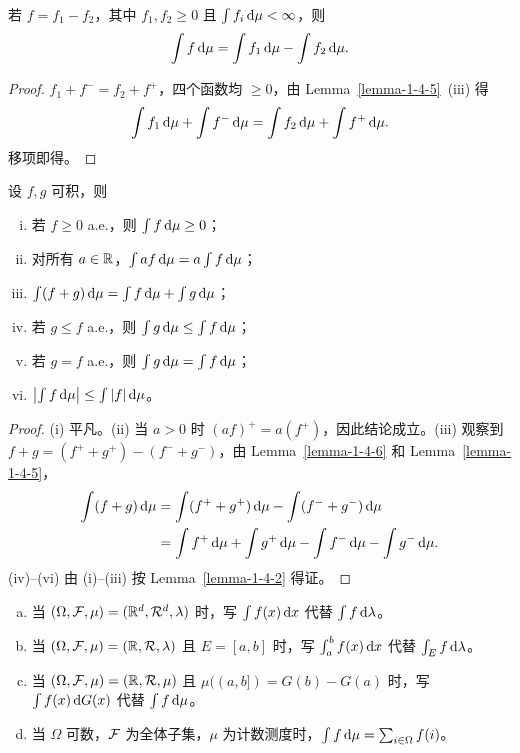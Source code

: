 \begin{lemma}\label{lemma-1-4-6}
    若 $f = f_1 - f_2$，其中 $f_1, f_2 \ge 0$ 且 $\int f_i \,\mathrm{d}\mu < \infty$，则
    \[
        \int f \,\mathrm{d}\mu = \int f_1 \,\mathrm{d}\mu - \int f_2 \,\mathrm{d}\mu.
    \]
\end{lemma}

\begin{proof}
    $f_1 + f^- = f_2 + f^+$，四个函数均 $\ge 0$，由 Lemma~\ref{lemma-1-4-5}~(iii) 得
    \[
        \int f_1 \,\mathrm{d}\mu + \int f^- \,\mathrm{d}\mu = \int f_2 \,\mathrm{d}\mu + \int f^+ \,\mathrm{d}\mu.
    \]
    移项即得。
\end{proof}

\begin{theorem}\label{theorem-1-4-7}
    设 $f,g$ 可积，则
    \begin{enumerate}[(i)]
        \item 若 $f \ge 0$ a.e.，则 $\int f \,\mathrm{d}\mu \ge 0$；
        \item 对所有 $a \in \mathbb{R}$，$\int af \,\mathrm{d}\mu = a \int f \,\mathrm{d}\mu$；
        \item $\int (f+g) \,\mathrm{d}\mu = \int f \,\mathrm{d}\mu + \int g \,\mathrm{d}\mu$；
        \item 若 $g \le f$ a.e.，则 $\int g \,\mathrm{d}\mu \le \int f \,\mathrm{d}\mu$；
        \item 若 $g = f$ a.e.，则 $\int g \,\mathrm{d}\mu = \int f \,\mathrm{d}\mu$；
        \item $\left|\int f \,\mathrm{d}\mu\right| \le \int |f| \,\mathrm{d}\mu$。
    \end{enumerate}
\end{theorem}

\begin{proof}
    (i) 平凡。(ii) 当 $a > 0$ 时 $(af)^+ = a(f^+)$，因此结论成立。(iii) 观察到 $f+g = (f^+ + g^+) - (f^- + g^-)$，由 Lemma~\ref{lemma-1-4-6} 和 Lemma~\ref{lemma-1-4-5}，
    \begin{align*}
        \int(f+g)\,\mathrm{d}\mu & = \int (f^+ + g^+) \,\mathrm{d}\mu - \int (f^- + g^-)\,\mathrm{d}\mu                         \\
                         & = \int f^+ \,\mathrm{d}\mu + \int g^+ \,\mathrm{d}\mu - \int f^- \,\mathrm{d}\mu - \int g^- \,\mathrm{d}\mu.
    \end{align*}
    (iv)--(vi) 由 (i)--(iii) 按 Lemma~\ref{lemma-1-4-2} 得证。
\end{proof}

\medskip{}
\begin{enumerate}[(a)]
    \item 当 $(\Omega,\mathcal{F},\mu) = (\mathbb{R}^d, \mathcal{R}^d, \lambda)$ 时，写 $\int f(x) \,\mathrm{d} x$ 代替 $\int f \,\mathrm{d}\lambda$。
    \item 当 $(\Omega,\mathcal{F},\mu) = (\mathbb{R}, \mathcal{R}, \lambda)$ 且 $E = [a,b]$ 时，写 $\int_a^b f(x) \,\mathrm{d} x$ 代替 $\int_E f \,\mathrm{d}\lambda$。
    \item 当 $(\Omega,\mathcal{F},\mu) = (\mathbb{R}, \mathcal{R}, \mu)$ 且 $\mu((a,b]) = G(b) - G(a)$ 时，写 $\int f(x) \,\mathrm{d} G(x)$ 代替 $\int f \,\mathrm{d}\mu$。
    \item 当 $\Omega$ 可数，$\mathcal{F}$ 为全体子集，$\mu$ 为计数测度时，$\int f \,\mathrm{d}\mu = \sum_{i \in \Omega} f(i)$。
\end{enumerate}

